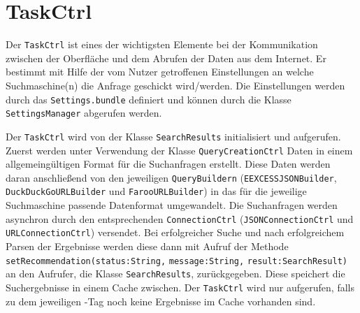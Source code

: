 
\section{TaskCtrl}
Der \lstinline|TaskCtrl| ist eines der wichtigsten Elemente bei der Kommunikation zwischen der Oberfläche und dem Abrufen der Daten aus dem Internet. Er bestimmt mit Hilfe der vom Nutzer getroffenen Einstellungen an welche Suchmaschine(n) die Anfrage geschickt wird/werden. Die Einstellungen werden durch das \lstinline|Settings.bundle| definiert und können durch die Klasse \lstinline|SettingsManager| abgerufen werden. 

Der \lstinline|TaskCtrl| wird von der Klasse \lstinline|SearchResults| initialisiert und aufgerufen. Zuerst werden unter Verwendung der Klasse \lstinline|QueryCreationCtrl| Daten in einem allgemeingültigen Format für die Suchanfragen erstellt. Diese Daten werden daran anschließend von den jeweiligen \lstinline|QueryBuildern| (\lstinline|EEXCESSJSONBuilder|, \lstinline|DuckDuckGoURLBuilder| und \lstinline|FarooURLBuilder|) in das für die jeweilige Suchmaschine passende Datenformat umgewandelt. Die Suchanfragen werden asynchron durch den entsprechenden \verb|ConnectionCtrl| (\lstinline|JSONConnectionCtrl| und \lstinline|URLConnectionCtrl|) versendet. Bei erfolgreicher Suche und nach erfolgreichem Parsen der Ergebnisse werden diese dann mit Aufruf der Methode \lstinline|setRecommendation(|\lstinline|status:String,| \lstinline|message:String,| \lstinline|result:SearchResult)| an den Aufrufer, die Klasse \lstinline|SearchResults|, zurückgegeben. Diese speichert die Suchergebnisse in einem Cache zwischen. Der \lstinline|TaskCtrl| wird nur aufgerufen, falls zu dem jeweiligen \SEARCH-Tag noch keine Ergebnisse im Cache vorhanden sind.